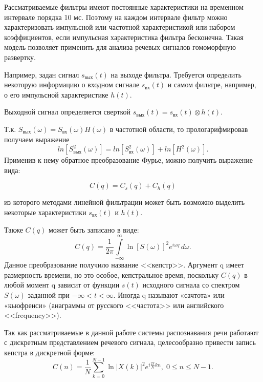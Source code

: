 \documentclass[a4paper,14pt,russian,utf8,nocolumnsxix,nocolumnxxxi,nocolumnxxxii]{eskdtext}
\begin{document}
Рассматриваемые фильтры имеют постоянные характеристики на временном интервале порядка 10 мс. Поэтому на каждом интервале фильтр можно характеризовать импульсной или частотной характеристикой или набором коэффициентов, если импульсная характеристика фильтра бесконечна. Такая модель позволяет применить для анализа речевых сигналов гомоморфную развертку.


Например, задан сигнал $s_{\text{вых}}(t)$ на выходе фильтра. Требуется определить некоторую информацию о входном сигнале $s_{\text{вх}}(t)$ и самом фильтре, например, о его импульсной характеристике $h(t)$.

Выходной сигнал определяется сверткой $s_{\text{вых}}(t)=s_{\text{вх}}(t)\otimes h(t)$.

Т.к. $S_{\text{вых}}(\omega)=S_{\text{вх}}(\omega)H(\omega)$ в частотной области, то прологарифмировав получаем выражение 
\begin{equation}
ln[S^2_{\text{вых}}(\omega)]=ln[S^{2}_{\text{вх}}(\omega)]+ln[H^{2}(\omega)].
\end{equation}
Применив к нему обратное преобразование Фурье, можно получить выражение вида:

\begin{equation}
C(q)=C_{s}(q)+C_{h}(q)
\end{equation}

из которого методами линейной фильтрации может быть возможно выделить некоторые характеристики $s_{\text{вх}}(t)$ и $h(t)$.

Также $C(q)$ может быть записано в виде:
\begin{equation}
 C(q)={\frac{1}{2\pi}}\int\limits_{-\infty}^{\infty} \ln [S(\omega)]^2 e^{i\omega q}\, d\omega .
\end{equation}
Данное преобразование получило название <<кепстр>>. Аргумент q имеет размерность времени, но это особое, кепстральное время, поскольку $C(q)$ в любой момент q зависит от функции $s(t)$ исходного сигнала со спектром $S(\omega)$ заданной при $-\infty<t<\infty$. Иногда q называют «сачтота» или «кьюфренси» (анаграммы от русского <<частота>> или английского <<frequency>>).

Так как рассматриваемые в данной работе системы распознавания речи работают с дискретным представлением речевого сигнала, целесообразно привести запись кепстра в дискретной форме:
\begin{equation}
C(n)=\frac{1}{N}\sum_{k=0}^{N-1}{\ln|{X(k)}|^2e^{i\frac{2\pi}{N}kn}}, \; 0\leq n\leq N-1.
\end{equation}
\end{document}
